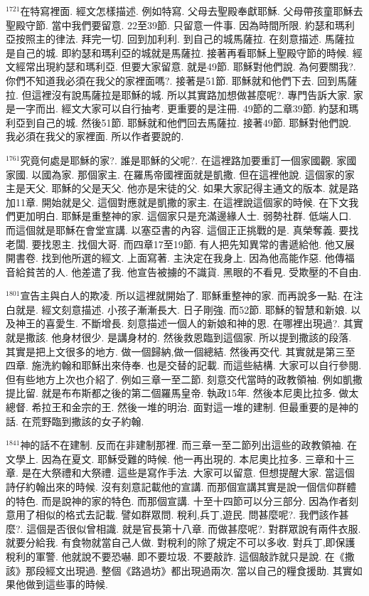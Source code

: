 \documentclass{book}
\begin{document}
$^{1721}$在特寫裡面.
經文怎樣描述.
例如特寫.
父母去聖殿奉獻耶穌.
父母帶孩童耶穌去聖殿守節.
當中我們要留意.
22至39節.
只留意一件事.
因為時間所限.
約瑟和瑪利亞按照主的律法.
拜完一切.
回到加利利.
到自己的城馬薩拉.
在刻意描述.
馬薩拉是自己的城.
即約瑟和瑪利亞的城就是馬薩拉.
接著再看耶穌上聖殿守節的時候.
經文經常出現約瑟和瑪利亞.
但要大家留意.
就是49節.
耶穌對他們說.
為何要關我?.
你們不知道我必須在我父的家裡面嗎?.
接著是51節.
耶穌就和他們下去.
回到馬薩拉.
但這裡沒有說馬薩拉是耶穌的城.
所以其實路加想做甚麼呢?.
專門告訴大家.
家是一字而出.
經文大家可以自行抽考.
更重要的是注冊.
49節的二章39節.
約瑟和瑪利亞到自己的城.
然後51節.
耶穌就和他們回去馬薩拉.
接著49節.
耶穌對他們說.
我必須在我父的家裡面.
所以作者要說的.

$^{1761}$究竟何處是耶穌的家?.
誰是耶穌的父呢?.
在這裡路加要重訂一個家國觀.
家國家國.
以國為家.
那個家主.
在羅馬帝國裡面就是凱撒.
但在這裡他說.
這個家的家主是天父.
耶穌的父是天父.
他亦是宋徒的父.
如果大家記得主通文的版本.
就是路加11章.
開始就是父.
這個對應就是凱撒的家主.
在這裡說這個家的時候.
在下文我們更加明白.
耶穌是重整神的家.
這個家只是充滿邊緣人士.
弱勢社群.
低端人口.
而這個就是耶穌在會堂宣講.
以塞亞書的內容.
這個正正挑戰的是.
真榮奪義.
要找老闆.
要找恩主.
找個大哥.
而四章17至19節.
有人把先知異常的書遞給他.
他又展開書卷.
找到他所選的經文.
上面寫著.
主決定在我身上.
因為他高能作惡.
他傳福音給貧苦的人.
他差遣了我.
他宣告被擄的不識貨.
黑眼的不看見.
受欺壓的不自由.

$^{1801}$宣告主與白人的欺凌.
所以這裡就開始了.
耶穌重整神的家.
而再說多一點.
在注白就是.
經文刻意描述.
小孩子漸漸長大.
日子剛強.
而52節.
耶穌的智慧和新娘.
以及神王的喜愛生.
不斷增長.
刻意描述一個人的新娘和神的恩.
在哪裡出現過?.
其實就是撒該.
他身材很少.
是講身材的.
然後救恩臨到這個家.
所以提到撒該的段落.
其實是把上文很多的地方.
做一個歸納,做一個總結.
然後再交代.
其實就是第三至四章.
施洗約翰和耶穌出來侍奉.
也是交替的記載.
而這些結構.
大家可以自行參閱.
但有些地方上次也介紹了.
例如三章一至二節.
刻意交代當時的政教領袖.
例如凱撒提比留.
就是布布斯都之後的第二個羅馬皇帝.
執政15年.
然後本尼奧比拉多.
做太總督.
希拉王和金宗的王.
然後一堆的明治.
面對這一堆的建制.
但最重要的是神的話.
在荒野臨到撒該的女子約翰.

$^{1841}$神的話不在建制.
反而在非建制那裡.
而三章一至二節列出這些的政教領袖.
在文學上.
因為在夏文.
耶穌受難的時候.
他一再出現的.
本尼奧比拉多.
三章和十三章.
是在大祭禮和大祭禮.
這些是寫作手法.
大家可以留意.
但想提醒大家.
當這個詩仔約翰出來的時候.
沒有刻意記載他的宣講.
而那個宣講其實是說一個信仰群體的特色.
而是說神的家的特色.
而那個宣講.
十至十四節可以分三部分.
因為作者刻意用了相似的格式去記載.
譬如群眾問.
稅利,兵丁,遊民.
問甚麼呢?.
我們該作甚麼?.
這個是否很似曾相識.
就是官長第十八章.
而做甚麼呢?.
對群眾說有兩件衣服.
就要分給我.
有食物就當自己人做.
對稅利的除了規定不可以多收.
對兵丁,即保護稅利的軍警.
他就說不要恐嚇.
即不要垃圾.
不要敲詐.
這個敲詐就只是說.
在《撒該》那段經文出現過.
整個《路過坊》都出現過兩次.
當以自己的糧食援助.
其實如果他做到這些事的時候.
\end{document}
